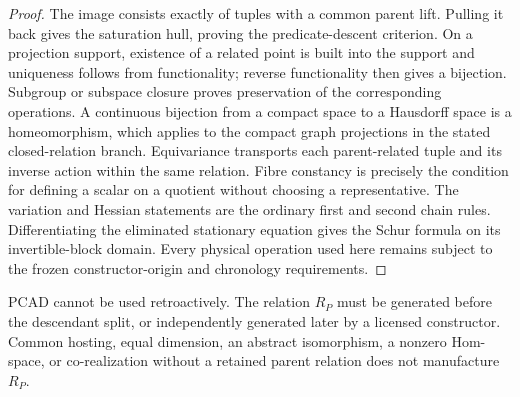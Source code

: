 \documentclass[12pt,a4paper]{article}
\begin{document}
\begin{proof}
The image consists exactly of tuples with a common parent lift. Pulling it
back gives the saturation hull, proving the predicate-descent criterion.
On a projection support, existence of a related point is built into the
support and uniqueness follows from functionality; reverse functionality
then gives a bijection. Subgroup or subspace closure proves preservation of
the corresponding operations. A continuous bijection from a compact space
to a Hausdorff space is a homeomorphism, which applies to the compact graph
projections in the stated closed-relation branch.
Equivariance transports each parent-related tuple and its inverse action
within the same relation. Fibre constancy is precisely the condition for
defining a scalar on a quotient without choosing a representative.
The variation and Hessian statements are the ordinary first and second chain
rules. Differentiating the eliminated stationary equation gives the Schur
formula on its invertible-block domain. Every physical operation used here
remains subject to the frozen constructor-origin and chronology requirements.
\end{proof}

\begin{corollary}
\label{p2a:cor:v187-pcad-chronology-firewall}
PCAD cannot be used retroactively.  The relation $R_P$ must be generated before
the descendant split, or independently generated later by a licensed
constructor.  Common hosting, equal dimension, an abstract isomorphism, a
nonzero Hom-space, or co-realization without a retained parent relation does
not manufacture $R_P$.
\end{corollary}
\end{document}
